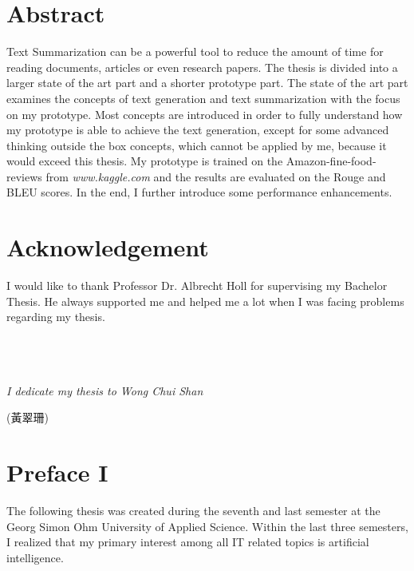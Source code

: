 \thispagestyle{empty}

\section*{Abstract}
\label{sec:abstract}

Text Summarization can be a powerful tool to reduce the amount of time for reading documents, articles or even research papers. The thesis is divided into a larger state of the art part and a shorter prototype part. The state of the art part examines the concepts of text generation and text summarization with the focus on my prototype. Most concepts are introduced in order to fully understand how my prototype is able to achieve the text generation, except for some advanced thinking outside the box concepts, which cannot be applied by me, because it would exceed this thesis. My prototype is trained on the Amazon-fine-food-reviews from \textit{www.kaggle.com} and the results are evaluated on the Rouge and BLEU scores. In the end, I further introduce some performance enhancements. 

\null\newpage

\section*{Acknowledgement}

I would like to thank Professor Dr. Albrecht Holl for supervising my Bachelor Thesis. He always supported me and helped me a lot when I was facing problems regarding my thesis. \\ \\ \\ \\

\begin{center}
\LARGE{\textit{I dedicate my thesis to Wong Chui Shan} 
\begin{CJK*}{UTF8}{bsmi} 
	(黃翠珊)
\end{CJK*}
}
\end{center}
\null\newpage

\section*{Preface I}
\label{sec:prolog_1}

The following thesis was created during the seventh and last semester at the Georg Simon Ohm University of Applied Science. 
Within the last three semesters, I realized that my primary interest among all IT related topics is artificial intelligence.

